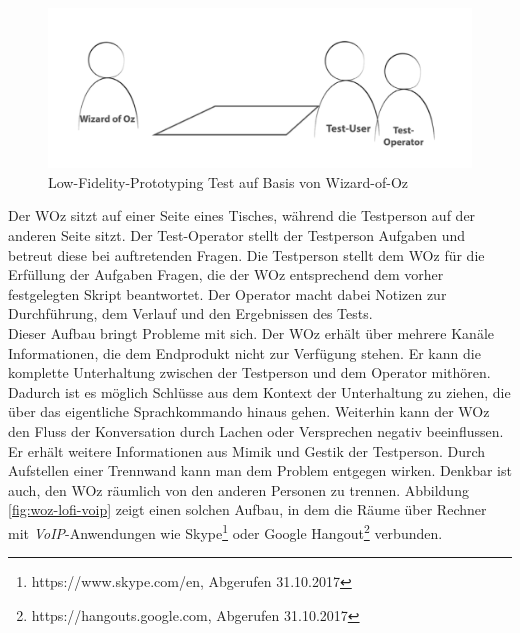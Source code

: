 \begin{figure}[!htb]
    \centering
    \includegraphics[width=1.0\textwidth]{bilder/3_wozLoFi.png}
    \caption{Low-Fidelity-Prototyping Test auf Basis von Wizard-of-Oz}
    \label{fig:woz-lofi}
\end{figure}

Der \ac{WOz} sitzt auf einer Seite eines Tisches, während die Testperson auf der anderen Seite sitzt. Der Test-Operator stellt der Testperson Aufgaben und betreut diese bei auftretenden Fragen. Die Testperson stellt dem \ac{WOz} für die Erfüllung der Aufgaben Fragen, die der \ac{WOz} entsprechend dem vorher festgelegten Skript beantwortet. Der Operator macht dabei Notizen zur Durchführung, dem Verlauf und den Ergebnissen des Tests.\\
Dieser Aufbau bringt Probleme mit sich. Der \ac{WOz} erhält über mehrere Kanäle Informationen, die dem Endprodukt nicht zur Verfügung stehen. Er kann die komplette Unterhaltung zwischen der Testperson und dem Operator mithören. Dadurch ist es möglich Schlüsse aus dem Kontext der Unterhaltung zu ziehen, die über das eigentliche Sprachkommando hinaus gehen. Weiterhin kann der \ac{WOz} den Fluss der Konversation durch Lachen oder Versprechen negativ beeinflussen. Er erhält weitere Informationen aus Mimik und Gestik der Testperson. Durch Aufstellen einer Trennwand kann man dem Problem entgegen wirken. Denkbar ist auch, den \ac{WOz} räumlich von den anderen Personen zu trennen. Abbildung \ref{fig:woz-lofi-voip} zeigt einen solchen Aufbau, in dem die Räume über Rechner mit \textit{\ac{VoIP}}-Anwendungen wie \zB Skype\footnote{https://www.skype.com/en, Abgerufen 31.10.2017} oder Google Hangout\footnote{https://hangouts.google.com, Abgerufen 31.10.2017} verbunden. 

